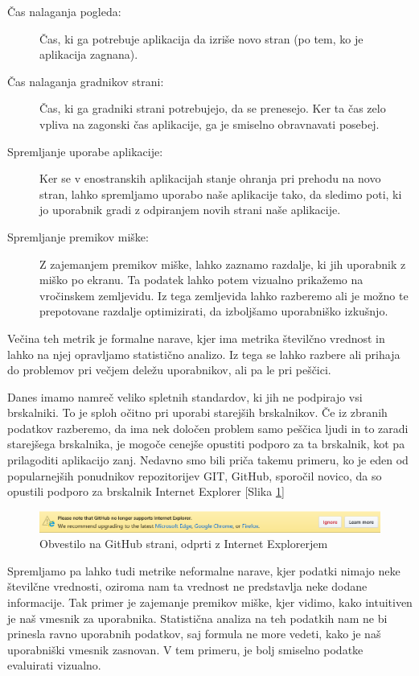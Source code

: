 \documentclass[a4paper, 12pt]{book}
\begin{document}
\begin{description}
	\item[Čas nalaganja pogleda:] Čas, ki ga potrebuje aplikacija da izriše novo stran (po tem, ko je aplikacija zagnana).
	\item[Čas nalaganja gradnikov strani:] Čas, ki ga gradniki strani potrebujejo, da se prenesejo. Ker ta čas zelo vpliva na zagonski čas aplikacije, ga je smiselno obravnavati posebej.
	\item[Spremljanje uporabe aplikacije:] Ker se v enostranskih aplikacijah stanje ohranja pri prehodu na novo stran, lahko spremljamo uporabo naše aplikacije tako, da sledimo poti, ki jo uporabnik gradi z odpiranjem novih strani naše aplikacije.
	\item[Spremljanje premikov miške:] Z zajemanjem premikov miške, lahko zaznamo razdalje, ki jih uporabnik  z miško po ekranu. Ta podatek lahko potem vizualno prikažemo na vročinskem zemljevidu. Iz tega zemljevida lahko razberemo ali je možno te prepotovane razdalje optimizirati, da izboljšamo uporabniško izkušnjo.
\end{description}

Večina teh metrik je formalne narave, kjer ima metrika številčno vrednost in lahko na njej opravljamo statistično analizo. Iz tega se lahko razbere ali prihaja do problemov pri večjem deležu uporabnikov, ali pa le pri peščici.

Danes imamo namreč veliko spletnih standardov, ki jih ne podpirajo vsi brskalniki. To je sploh očitno pri uporabi starejših brskalnikov. Če iz zbranih podatkov razberemo, da ima nek določen problem samo peščica ljudi in to zaradi starejšega brskalnika, je mogoče cenejše opustiti podporo za ta brskalnik, kot pa prilagoditi aplikacijo zanj. Nedavno smo bili priča takemu primeru, ko je eden od popularnejših ponudnikov repozitorijev GIT, GitHub, sporočil novico, da so opustili podporo za brskalnik Internet Explorer [Slika \ref{img:github_ie}]

\begin{figure}[h]
	\begin{center}
		\includegraphics[width=1\textwidth]{github_end_support.png}
	\end{center}
	\caption{Obvestilo na GitHub strani, odprti z Internet Explorerjem}
	\label{img:github_ie}
\end{figure}

Spremljamo pa lahko tudi metrike neformalne narave, kjer podatki nimajo neke številčne vrednosti, oziroma nam ta vrednost ne predstavlja neke dodane informacije. Tak primer je zajemanje premikov miške, kjer vidimo, kako intuitiven je naš vmesnik za uporabnika. Statistična analiza na teh podatkih nam ne bi prinesla ravno uporabnih podatkov, saj formula ne more vedeti, kako je naš uporabniški vmesnik zasnovan. V tem primeru, je bolj smiselno podatke evaluirati vizualno.
\end{document}
